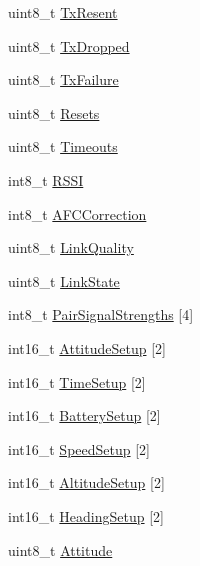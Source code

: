 \begin{DoxyCompactItemize}
\item 
uint8\-\_\-t \hyperlink{struct____attribute_____a356c57468e6cffc2be558173e2701561}{\-Tx\-Resent}
\item 
uint8\-\_\-t \hyperlink{struct____attribute_____ab2fd1e088c2d7cb16f9be10b60715969}{\-Tx\-Dropped}
\item 
uint8\-\_\-t \hyperlink{struct____attribute_____ad56588f1c5d1817112eb3b26476fd931}{\-Tx\-Failure}
\item 
uint8\-\_\-t \hyperlink{struct____attribute_____aa2f35a8f34385baa22dd83ae80313e6a}{\-Resets}
\item 
uint8\-\_\-t \hyperlink{struct____attribute_____aa3341743a43a6a4c6758f81f7b3bb137}{\-Timeouts}
\item 
int8\-\_\-t \hyperlink{struct____attribute_____aab1d35fb1b4b5389ba7d3a8df93174ac}{\-R\-S\-S\-I}
\item 
int8\-\_\-t \hyperlink{struct____attribute_____a392499f88b4daed4de6c218532b857d9}{\-A\-F\-C\-Correction}
\item 
uint8\-\_\-t \hyperlink{struct____attribute_____a7742e3525fe7e863e9b64efabc5638f7}{\-Link\-Quality}
\item 
uint8\-\_\-t \hyperlink{struct____attribute_____a62ebb85b9d2a7bac6a89d2b801933cdc}{\-Link\-State}
\item 
int8\-\_\-t \hyperlink{struct____attribute_____a27ae0bcfc8859e683c66641a90d64906}{\-Pair\-Signal\-Strengths} \mbox{[}4\mbox{]}
\item 
int16\-\_\-t \hyperlink{struct____attribute_____a0c47378479e4fb316927bc0e7083a324}{\-Attitude\-Setup} \mbox{[}2\mbox{]}
\item 
int16\-\_\-t \hyperlink{struct____attribute_____ac3c19ead2f560240048d967415add527}{\-Time\-Setup} \mbox{[}2\mbox{]}
\item 
int16\-\_\-t \hyperlink{struct____attribute_____ac7962e10d6f6f3834a12c5cd7934d60d}{\-Battery\-Setup} \mbox{[}2\mbox{]}
\item 
int16\-\_\-t \hyperlink{struct____attribute_____a2210c01a414e0a52c26e3f47291dba98}{\-Speed\-Setup} \mbox{[}2\mbox{]}
\item 
int16\-\_\-t \hyperlink{struct____attribute_____aafb4491ec7da3238bd095bf54b246056}{\-Altitude\-Setup} \mbox{[}2\mbox{]}
\item 
int16\-\_\-t \hyperlink{struct____attribute_____a318b4ac138ca7887757094f7bbf602d0}{\-Heading\-Setup} \mbox{[}2\mbox{]}
\item 
uint8\-\_\-t \hyperlink{struct____attribute_____ad91234c58bd136744bc7a1f7f7ae28fb}{\-Attitude}

\end{DoxyCompactItemize}
